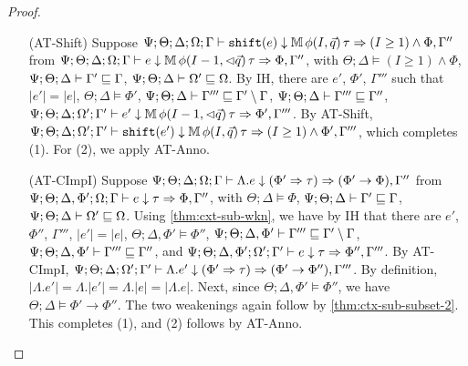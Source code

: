 \begin{proof}
\begin{itemize}
  \item[(AT-Shift)] Suppose $\Psi ; \Theta ; \Delta ; \Omega ; \Gamma \vdash \texttt{shift}(e) \downarrow \mathbb{M} \, \phi(I,\vec{q}) \, \tau \Rightarrow (I \geq 1) \wedge \Phi, \Gamma''$ from
  $\Psi ; \Theta ; \Delta  ; \Omega ; \Gamma \vdash e \downarrow \mathbb{M} \, \phi(I - 1,\lhd \vec{q}) \, \tau \Rightarrow \Phi, \Gamma''$, with
  $\Theta ; \Delta \vDash (I \geq 1) \wedge \Phi$,
  $\Psi ; \Theta ; \Delta \vdash \Gamma' \sqsubseteq \Gamma$,
  $\Psi ; \Theta ; \Delta \vdash \Omega' \sqsubseteq \Omega$.
  By IH, there are $e'$, $\Phi'$, $\Gamma'''$ such that
  $|e'| = |e|$,
  $\Theta ; \Delta \vDash \Phi'$,
  $\Psi ; \Theta ; \Delta \vdash \Gamma''' \sqsubseteq \Gamma' \setminus \Gamma$,
  $\Psi ; \Theta ; \Delta \vdash \Gamma''' \sqsubseteq \Gamma''$,
  $\Psi ; \Theta ; \Delta ; \Omega' ; \Gamma' \vdash e' \downarrow \mathbb{M} \, \phi(I-1,\lhd \vec{q}) \, \tau \Rightarrow \Phi', \Gamma'''$.
  By AT-Shift,
  $\Psi ; \Theta ; \Delta ; \Omega' ; \Gamma' \vdash \texttt{shift}(e') \downarrow \mathbb{M} \, \phi(I,\vec{q}) \, \tau \Rightarrow (I \geq 1) \wedge \Phi', \Gamma'''$,
  which completes (1). For (2), we apply AT-Anno.
  
  \item[(AT-CImpI)] Suppose $\Psi ; \Theta ; \Delta ; \Omega ; \Gamma \vdash \Lambda .e \downarrow (\Phi' \Rightarrow \tau) \Rightarrow (\Phi' \to \Phi),\Gamma''$ from
  $\Psi ; \Theta ; \Delta, \Phi'; \Omega ; \Gamma \vdash e \downarrow \tau \Rightarrow \Phi,\Gamma''$, with
  $\Theta ; \Delta \vDash \Phi$,
  $\Psi ; \Theta ; \Delta \vdash \Gamma' \sqsubseteq \Gamma$,
  $\Psi ; \Theta ; \Delta \vdash \Omega' \sqsubseteq \Omega$.
  Using \autoref{thm:cxt-sub-wkn}, we have by IH that there are $e'$, $\Phi''$, $\Gamma'''$,
  $|e'| = |e|$,
  $\Theta ; \Delta, \Phi' \vDash \Phi''$,
  $\Psi ; \Theta ; \Delta, \Phi' \vdash \Gamma''' \sqsubseteq \Gamma' \setminus \Gamma$,
  $\Psi ; \Theta ; \Delta, \Phi' \vdash \Gamma''' \sqsubseteq \Gamma''$, and
  $\Psi ; \Theta ; \Delta, \Phi' ; \Omega' ; \Gamma' \vdash e \downarrow \tau \Rightarrow \Phi'', \Gamma'''$.
  By AT-CImpI,
  $\Psi ; \Theta ; \Delta ; \Omega' ; \Gamma' \vdash \Lambda .e' \downarrow (\Phi' \Rightarrow \tau) \Rightarrow (\Phi' \to \Phi''),\Gamma'''$.
  By definition, $|\Lambda .e'| = \Lambda.|e'| = \Lambda.|e| = |\Lambda.e|$.
  Next, since $\Theta ; \Delta, \Phi' \vDash \Phi''$, we have $\Theta ; \Delta \vDash \Phi' \to \Phi''$.
  The two weakenings again follow by \autoref{thm:ctx-sub-subset-2}.
  This completes (1), and (2) follows by AT-Anno.
  

\end{itemize}
\end{proof}
